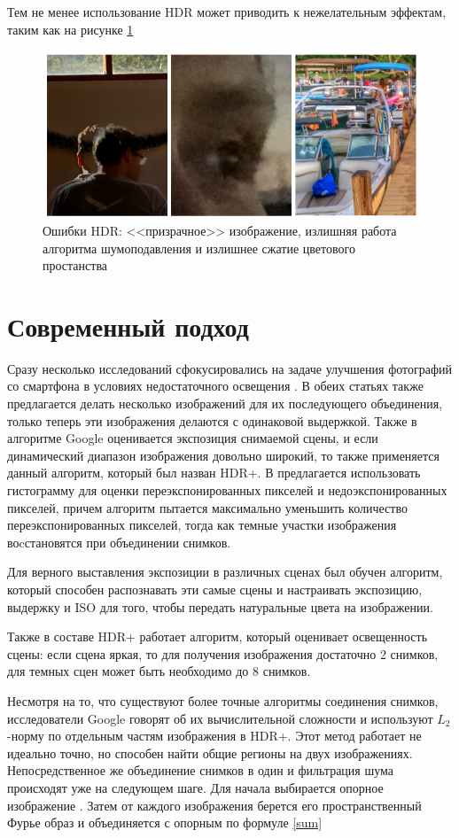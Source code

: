 \documentclass[a4paper,12pt]{article}
\begin{document}
Тем не менее использование HDR может приводить к нежелательным эффектам, таким как на рисунке \ref{fig:HDR_cons}

\begin{figure}[h!]
\centering
\includegraphics[width=0.7\linewidth]{HDR.png}
\caption{Ошибки HDR: <<призрачное>> изображение, излишняя работа алгоритма шумоподавления и излишнее сжатие цветового простанства}
\label{fig:HDR_cons}
\end{figure}

\section{Современный подход}
Сразу несколько исследований сфокусировались на задаче улучшения фотографий со смартфона в условиях недостаточного освещения \cite{Gavic, Google2}. В обеих статьях также предлагается делать несколько изображений для их последующего объединения, только теперь эти изображения делаются с одинаковой выдержкой. Также в алгоритме Google оценивается экспозиция снимаемой сцены, и если динамический диапазон изображения довольно широкий, то также применяется данный алгоритм, который был назван HDR+. В \cite{Google2} предлагается использовать гистограмму для оценки переэкспонированных пикселей и недоэкспонированных пикселей, причем алгоритм пытается максимально уменьшить количество переэкспонированных пикселей, тогда как темные участки изображения воcстановятся при объединении снимков. 

Для верного выставления экспозиции в различных сценах был обучен алгоритм, который способен распознавать эти самые сцены и настраивать экспозицию, выдержку и ISO для того, чтобы передать натуральные цвета на изображении. 

Также в составе HDR+ работает алгоритм, который оценивает освещенность сцены: если сцена яркая, то для получения изображения достаточно 2 снимков, для темных сцен может быть необходимо до 8 снимков.

Несмотря на то, что существуют более точные алгоритмы соединения снимков, исследователи Google говорят об их вычислительной сложности и используют $L_2$-норму по отдельным частям изображения в HDR+. Этот метод работает не идеально точно, но способен найти общие регионы на двух изображениях. Непосредственное же объединение снимков в один и фильтрация шума происходят уже на следующем шаге. Для начала выбирается опорное изображение \cite{Google1,Wiki1}. Затем от каждого изображения берется его пространственный Фурье образ и объединяется с опорным по формуле \ref{sum}
\end{document}
